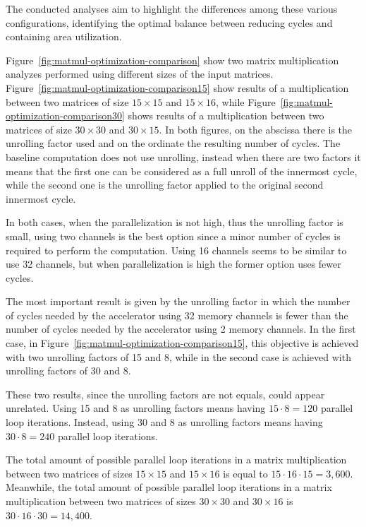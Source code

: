 The conducted analyses aim to highlight the differences among these various configurations, identifying the optimal balance between reducing cycles and containing area utilization.

Figure~\ref{fig:matmul-optimization-comparison} show two matrix multiplication analyzes performed using different sizes of the input matrices.
Figure~\ref{fig:matmul-optimization-comparison15} show results of a multiplication between two matrices of size $15\times15$ and $15\times16$, while Figure~\ref{fig:matmul-optimization-comparison30} shows results of a multiplication between two matrices of size $30\times30$ and $30\times15$.
In both figures, on the abscissa there is the unrolling factor used and on the ordinate the resulting number of cycles.
The baseline computation does not use unrolling, instead when there are two factors it means that the first one can be considered as a full unroll of the innermost cycle, while the second one is the unrolling factor applied to the original second innermost cycle.

In both cases, when the parallelization is not high, thus the unrolling factor is small, using two channels is the best option since a minor number of cycles is required to perform the computation.
Using 16 channels seems to be similar to use 32 channels, but when parallelization is high the former option uses fewer cycles.

The most important result is given by the unrolling factor in which the number of cycles needed by the accelerator using 32 memory channels is fewer than the number of cycles needed by the accelerator using 2 memory channels.
In the first case, in Figure~\ref{fig:matmul-optimization-comparison15}, this objective is achieved with two unrolling factors of 15 and 8, while in the second case is achieved with unrolling factors of 30 and 8.

These two results, since the unrolling factors are not equals, could appear unrelated.
Using 15 and 8 as unrolling factors means having $15 \cdot 8 = 120$ parallel loop iterations.
Instead, using 30 and 8 as unrolling factors means having $30 \cdot 8 = 240$ parallel loop iterations.

The total amount of possible parallel loop iterations in a matrix multiplication between two matrices of sizes $15\times15$ and $15\times16$ is equal to $15 \cdot 16 \cdot 15 = 3,600$.
Meanwhile, the total amount of possible parallel loop iterations in a matrix multiplication between two matrices of sizes $30\times30$ and $30\times16$ is $30 \cdot 16 \cdot 30 = 14,400$.

